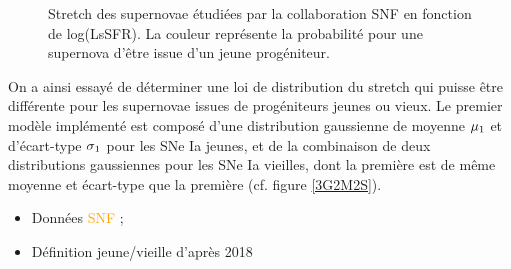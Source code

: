 \documentclass[a4paper, 12pt, svgnames]{article}
\begin{document}
\begin{figure}[htbp!]
    \centering
    \captionsetup{justification=centering}
    \caption{Stretch des supernovae étudiées par la collaboration SNF en
    fonction de log(LsSFR). La couleur représente la probabilité pour une
supernova d'être issue d'un jeune progéniteur.}
\end{figure}

On a ainsi essayé de déterminer une loi de distribution du stretch qui puisse
être différente pour les supernovae issues de progéniteurs jeunes ou vieux. Le
premier modèle implémenté est composé d'une distribution gaussienne de moyenne
$\mu_1$ et d'écart-type $\sigma_1$ pour les SNe Ia jeunes, et de la combinaison de
deux distributions gaussiennes pour les SNe Ia vieilles, dont la première est de
même moyenne et écart-type que la première (cf. figure \ref{3G2M2S}).


\begin{itemize}
    \item Données \textcolor{orange}{SNF} ;
    \item Définition jeune/vieille d'après  2018
\end{itemize}
\end{document}
